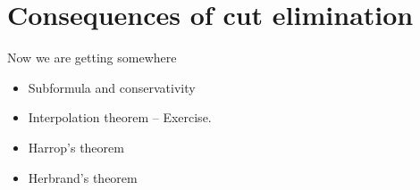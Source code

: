 %
\chapter{Consequences of cut elimination}
\label{c-ce-conseq}
%
Now we are getting somewhere

\bigskip

\begin{itemize}
	\item Subformula and conservativity
	\item Interpolation theorem -- Exercise.
	\item Harrop's theorem
	\item Herbrand's theorem
\end{itemize}
